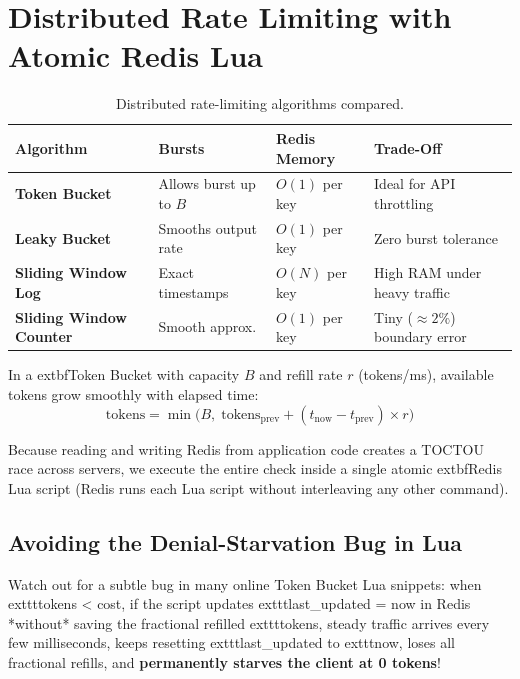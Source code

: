 \section{Distributed Rate Limiting with Atomic Redis Lua}

\begin{table}[htbp]
\centering
\small\sffamily
\begin{tabular}{@{}llll@{}}
\toprule
\textbf{Algorithm} & \textbf{Bursts} & \textbf{Redis Memory} & \textbf{Trade-Off} \\ \midrule
\textbf{Token Bucket} & Allows burst up to $B$ & $O(1)$ per key & Ideal for API throttling \\
\textbf{Leaky Bucket} & Smooths output rate & $O(1)$ per key & Zero burst tolerance \\
\textbf{Sliding Window Log} & Exact timestamps & $O(N)$ per key & High RAM under heavy traffic \\
\textbf{Sliding Window Counter} & Smooth approx. & $O(1)$ per key & Tiny ($\approx 2\%$) boundary error \\ \bottomrule
\end{tabular}
\caption{Distributed rate-limiting algorithms compared.}
\label{tab:v1-ch07-rate-limiters}
\end{table}

In a 	extbf{Token Bucket} with capacity $B$ and refill rate $r$ (tokens/ms), available tokens grow smoothly with elapsed time:
$$\text{tokens} = \min\big(B, \; \text{tokens}_{\text{prev}} + (t_{\text{now}} - t_{\text{prev}}) \times r\big)$$

Because reading and writing Redis from application code creates a TOCTOU race across servers, we execute the entire check inside a single atomic 	extbf{Redis Lua script} (Redis runs each Lua script without interleaving any other command).

\subsection{Avoiding the Denial-Starvation Bug in Lua}

Watch out for a subtle bug in many online Token Bucket Lua snippets: when 	exttt{tokens < cost}, if the script updates 	exttt{last\_updated = now} in Redis *without* saving the fractional refilled 	exttt{tokens}, steady traffic arrives every few milliseconds, keeps resetting 	exttt{last\_updated} to 	exttt{now}, loses all fractional refills, and \textbf{permanently starves the client at 0 tokens}!

